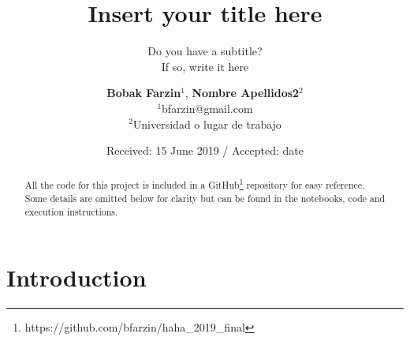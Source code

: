 \documentclass[smallextended]{svjour3}       %
\begin{document}
\title{Insert your title here%
}
\subtitle{Do you have a subtitle?\\ If so, write it here}


\author {\textbf{Bobak Farzin$^1$}, \textbf{Nombre Apellidos2$^2$}\\
	$^1$bfarzin@gmail.com\\
	$^2$Universidad o lugar de trabajo\\
}




\date{Received: 15 June 2019 / Accepted: date}


\maketitle

\begin{abstract}

All the code for this project is included in a GitHub\footnote{https://github.com/bfarzin/haha\_2019\_final} repository for easy reference.  Some details are omitted below for clarity but can be found in the notebooks, code and execution instructions.

\end{abstract}

\section{Introduction}
\label{intro}
\end{document}
